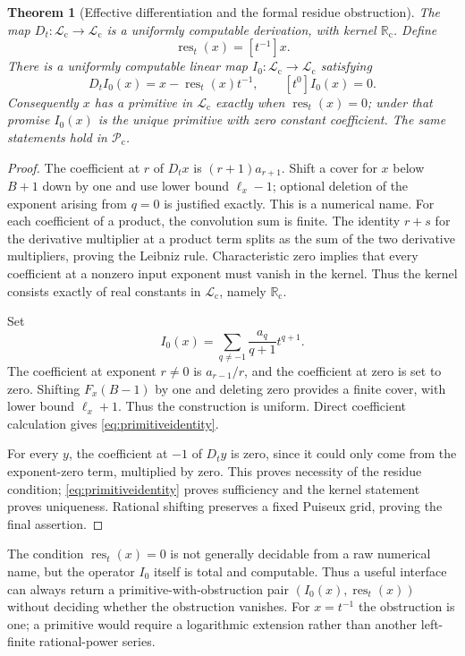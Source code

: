 \documentclass[11pt,letterpaper]{article}
\numberwithin{equation}{section}
\newtheorem{theorem}{Theorem}[section]
\theoremstyle{definition}
\theoremstyle{remark}
\newcommand{\Rc}{\mathbb R_{\mathrm c}}
\newcommand{\Lc}{\mathcal L_{\mathrm c}}
\newcommand{\Pc}{\mathcal P_{\mathrm c}}
\newcommand{\res}{\operatorname{res}}
\newcommand{\coef}[2]{[t^{#1}]#2}
\begin{document}
\begin{theorem}[Effective differentiation and the formal residue obstruction]
\label{thm:integration}
The map $D_t:\Lc\to\Lc$ is a uniformly computable derivation, with kernel
$\Rc$. Define
\[
 \res_t(x)=\coef{-1}x.
\]
There is a uniformly computable linear map $I_0:\Lc\to\Lc$ satisfying
\begin{equation}\label{eq:primitiveidentity}
 D_t I_0(x)=x-\res_t(x)t^{-1},\qquad
 \coef0{I_0(x)}=0.
\end{equation}
Consequently $x$ has a primitive in $\Lc$ exactly when $\res_t(x)=0$;
under that promise $I_0(x)$ is the unique primitive with zero constant
coefficient. The same statements hold in $\Pc$.
\end{theorem}
\begin{proof}
The coefficient at $r$ of $D_tx$ is $(r+1)a_{r+1}$. Shift a cover for $x$
below $B+1$ down by one and use lower bound $\ell_x-1$; optional deletion
of the exponent arising from $q=0$ is justified exactly. This is a numerical
name. For each coefficient of a product, the convolution sum is finite.
The identity $r+s$ for the derivative multiplier at a product term splits
as the sum of the two derivative multipliers, proving the Leibniz rule.
Characteristic zero implies that every coefficient at a nonzero input
exponent must vanish in the kernel. Thus the kernel consists exactly of
real constants in $\Lc$, namely $\Rc$.

Set
\begin{equation}\label{eq:I0}
 I_0(x)=\sum_{q\ne-1}\frac{a_q}{q+1}t^{q+1}.
\end{equation}
The coefficient at exponent $r\ne0$ is $a_{r-1}/r$, and the coefficient
at zero is set to zero. Shifting $F_x(B-1)$ by one and deleting zero
provides a finite cover, with lower bound $\ell_x+1$. Thus the construction
is uniform. Direct coefficient calculation gives
\eqref{eq:primitiveidentity}.

For every $y$, the coefficient at $-1$ of $D_ty$ is zero, since it could
only come from the exponent-zero term, multiplied by zero. This proves
necessity of the residue condition; \eqref{eq:primitiveidentity} proves
sufficiency and the kernel statement proves uniqueness. Rational shifting
preserves a fixed Puiseux grid, proving the final assertion.
\end{proof}

The condition $\res_t(x)=0$ is not generally decidable from a raw numerical
name, but the operator $I_0$ itself is total and computable. Thus a useful
interface can always return a primitive-with-obstruction pair
$(I_0(x),\res_t(x))$ without deciding whether the obstruction vanishes.
For $x=t^{-1}$ the obstruction is one; a primitive would require a
logarithmic extension rather than another left-finite rational-power
series.
\end{document}
